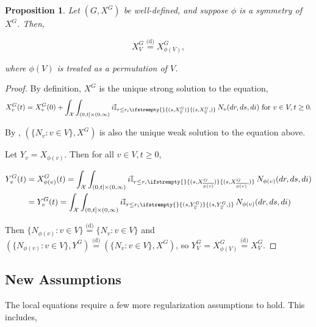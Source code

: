 \documentclass[12pt]{article}
\newcommand{\mb}{\mathbb}
\newcommand{\mc}{\mathcal}
\newcommand{\ov}{\overline}
\newcommand{\te}{\text}
\newcommand{\ind}{\hspace{24pt}}
\newcommand{\deq}{\overset{\text{(d)}}{=}}			%
\newcommand{\sta}{\mc{X}}							%
\newcommand{\cl}[1]{\ov{#1}}						%
\newcommand{\Xf}{X}									%
\newcommand{\poiss}{N}								%
\newcommand{\rate}{r}								%
\newcommand{\poissv}[1]{_{#1}}						%
\newcommand{\vind}[1]{_{#1}}						%
\newcommand{\tme}[1]{(#1)}							%
\newcommand{\gind}[1]{^{#1}}						%
\newcommand{\stpara}[1]{_{#1}}						%
\newcommand{\tmepro}[3]{
\ifstrempty{#3}{
	(#1,#2)}{
	(#1,#2,#3)}}									%
\newcommand{\Xg}{Y}									%
\newtheorem{prop}[thms]{Proposition}
\begin{document}
\begin{prop}
Let \((G,\Xf\gind{G})\) be well-defined, and suppose \(\phi\) is a symmetry of \(\Xf\gind{G}\). Then,

\[\Xf\gind{G}\vind{V} \deq \Xf\gind{G}\vind{\phi(V)},\]

where \(\phi(V)\) is treated as a permutation of \(V\).
\label{a::simprop}
\end{prop}
\begin{proof}
By definition, \(\Xf\gind{G}\) is the unique strong solution to the equation,
\[\Xf\gind{G}\vind{v}\tme{t} = \Xf\gind{G}\vind{v}\tme{0} + \int_\sta\int_{(0,t]\times(0,\infty)} i\mb{I}_{r \leq \rate\stpara{i}\tmepro{s}{\Xf\gind{G}\vind{\cl{v}}}{}}\,\poiss\poissv{v}(dr,ds,di) \te{ for } v \in V, t \geq 0.\]

By \cite[Proposition 2.10]{Kur07}, \((\{\poiss\poissv{v}:v\in V\},\Xf\gind{G})\) is also the unique weak solution to the equation above.

\ind Let \(\Xg\vind{v} = \Xf\vind{\phi(v)}\). Then for all \(v\in V,t\geq 0\),

\begin{align*}
\Xg\gind{G}\vind{v}\tme{t} &= \Xf\gind{G}\vind{\phi(v)}\tme{t} = \int_\sta\int_{(0,t]\times(0,\infty)} i\mb{I}_{r \leq \rate\stpara{i}\tmepro{s}{\Xf\gind{G}\vind{\cl{\phi(v)}}}{}}\,\poiss\poissv{\phi(v)}(dr,ds,di)\\
&= \Xg\gind{G}\vind{v}\tme{t} = \int_\sta\int_{(0,t]\times(0,\infty)} i\mb{I}_{r \leq \rate\stpara{i}\tmepro{s}{\Xg\gind{G}\vind{\cl{v}}}{}}\,\poiss\poissv{\phi(v)}(dr,ds,di)\\
\end{align*}

Then \(\{\poiss\poissv{\phi(v)}:v \in V\} \deq \{\poiss\poissv{v}:v\in V\}\) and \((\{\poiss\poissv{\phi(v)}:v \in V\},\Xg\gind{G}) \deq (\{\poiss\poissv{v}:v \in V\},\Xf\gind{G})\), so \(\Xg\gind{G}\vind{V} = \Xf\gind{G}\vind{\phi(V)} \deq \Xf\gind{G}\vind{V}\).
\end{proof}



\subsection{New Assumptions}
\label{a::not}

The local equations require a few more regularization assumptions to hold. This includes,
\end{document}
